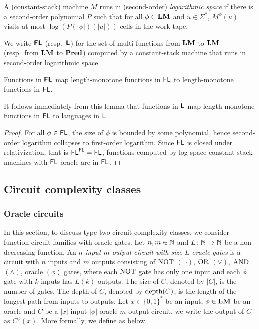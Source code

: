 \documentclass[envcountsame,orivec,oribibl]{llncs}
\begin{document}
\begin{definition}
 A (constant-stack) machine $M$ runs in (second-order) \emph{logarithmic space}
 if there is a second-order polynomial $P$ such that for all $\phi \in \mathbf{LM}$
 and $u \in \Sigma^*$, $M^\phi(u)$ visits at most $\log(P(|\phi|)(|u|))$ cells
 in the work tape.
\end{definition}

\begin{definition}
 We write $\text{\bfseries \sffamily \upshape FL}$ (resp.\ $\text{\bfseries \sffamily \upshape L}$) for the set of multi-functions 
 from $\mathbf{LM}$ to $\mathbf{LM}$ (resp.\ from $\mathbf{LM}$ to $\mathbf{Pred}$)
 computed by a constant-stack machine that runs in second-order logarithmic space.
\end{definition}

\begin{lemma}
\label{lemma:Ltwo-maps-L-to-L}
 Functions in $\text{\bfseries \sffamily \upshape FL}$ map 
 length-monotone functions in $\mathsf{FL}$
 to length-monotone functions in $\mathsf{FL}$.
\end{lemma}

It follows immediately from this lemma that functions in $\text{\bfseries \sffamily \upshape L}$ map
length-monotone functions in $\mathsf{FL}$ to languages in $\mathsf{L}$.

\begin{proof}
For all $\phi \in \mathsf{FL}$, the size of $\phi$ is bounded by some polynomial,
hence second-order logarithm collapses to first-order logarithm.
Since $\mathsf{FL}$ is closed under relativization, that is $\mathsf{FL}^{\mathsf{FL}} = \mathsf{FL}$,
functions computed by log-space constant-stack machines with $\mathsf{FL}$ oracle are in $\mathsf{FL}$.
\end{proof}


\subsection{Circuit complexity classes}
\subsubsection{Oracle circuits}

In this section, to discuss type-two circuit complexity classes,
we consider function-circuit families with oracle gates.
Let $n, m \in \mathbb N$ and $L \colon \mathbb N \to \mathbb N$ be a non-decreasing function.
An \emph{$n$-input $m$-output circuit with size-$L$ oracle gates} is a circuit with
$n$ inputs and $m$ outputs consisting of 
$\mathrm{NOT}$ $(\neg)$, $\mathrm{OR}$ $(\vee)$, $\mathrm{AND}$ $(\wedge)$, oracle $(\phi)$ gates,
where each $\mathrm{NOT}$ gate has only one input and each $\phi$ gate with $k$ inputs
has $L(k)$ outputs.
The size of $C$, denoted by $|C|$, is the number of gates.
The depth of $C$, denoted by $\mathop{\rm depth}(C)$, is the length of the longest path
from inputs to outputs.
Let $x \in \{0, 1\}^*$ be an input, $\phi \in \mathbf{LM}$ be an oracle and
$C$ be a $|x|$-input $|\phi|$-oracle $m$-output circuit,
we write the output of $C$ as $C^\phi(x)$.
More formally, we define as below.
\end{document}
